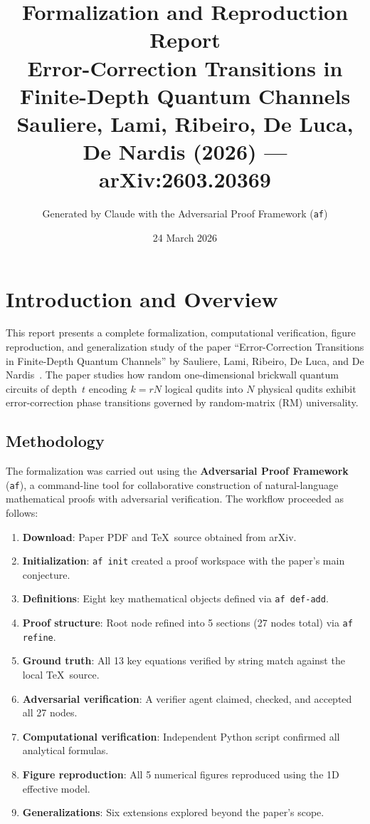 \documentclass[11pt,a4paper]{article}
\title{\textbf{Formalization and Reproduction Report}\\[6pt]
\large Error-Correction Transitions in Finite-Depth Quantum Channels\\[4pt]
\normalsize Sauliere, Lami, Ribeiro, De Luca, De Nardis (2026) --- arXiv:2603.20369}
\author{Generated by Claude with the Adversarial Proof Framework (\texttt{af})}
\date{24 March 2026}
\begin{document}
\maketitle
\tableofcontents
\newpage

\section{Introduction and Overview}

This report presents a complete formalization, computational verification, figure reproduction, and generalization study of the paper ``Error-Correction Transitions in Finite-Depth Quantum Channels'' by Sauliere, Lami, Ribeiro, De Luca, and De Nardis~\cite{Sauliere2026}. The paper studies how random one-dimensional brickwall quantum circuits of depth~$t$ encoding $k = rN$ logical qudits into $N$ physical qudits exhibit error-correction phase transitions governed by random-matrix (RM) universality.

\subsection{Methodology}

The formalization was carried out using the \textbf{Adversarial Proof Framework} (\texttt{af}), a command-line tool for collaborative construction of natural-language mathematical proofs with adversarial verification. The workflow proceeded as follows:
\begin{enumerate}
    \item \textbf{Download}: Paper PDF and \TeX\ source obtained from arXiv.
    \item \textbf{Initialization}: \texttt{af init} created a proof workspace with the paper's main conjecture.
    \item \textbf{Definitions}: Eight key mathematical objects defined via \texttt{af def-add}.
    \item \textbf{Proof structure}: Root node refined into 5 sections (27 nodes total) via \texttt{af refine}.
    \item \textbf{Ground truth}: All 13 key equations verified by string match against the local \TeX\ source.
    \item \textbf{Adversarial verification}: A verifier agent claimed, checked, and accepted all 27 nodes.
    \item \textbf{Computational verification}: Independent Python script confirmed all analytical formulas.
    \item \textbf{Figure reproduction}: All 5 numerical figures reproduced using the 1D effective model.
    \item \textbf{Generalizations}: Six extensions explored beyond the paper's scope.
\end{enumerate}
\end{document}
